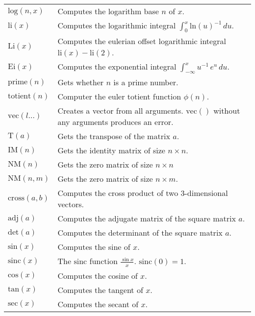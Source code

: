 \documentclass[10pt]{article}
\newcommand{\tabgap}{\vspace{3mm}\\}
\begin{document}
\begin{longtable}{p{}p{}}
        $ \mathrm{log}(n, x) $                     & Computes the logarithm base $ n $ of $ x $. \tabgap
        $ \mathrm{li}(x) $                         & Computes the logarithmic integral $ \int_0^x \mathrm{ln}(u)^{-1}\,du $. \\
        $ \mathrm{Li}(x) $                         & Computes the eulerian offset logarithmic integral $ \mathrm{li}(x) - \mathrm{li}(2) $. \\
        $ \mathrm{Ei}(x) $                         & Computes the exponential integral $ \int_{-\infty}^x u^{-1}\,e^u\,du $. \tabgap
        $ \mathrm{prime}(n) $                      & Gets whether $ n $ is a prime number. \\
        $ \mathrm{totient}(n) $                    & Computer the euler totient function $ \phi(n) $. \tabgap
        $ \mathrm{vec}(l\dots) $                   & Creates a vector from all arguments. $ \mathrm{vec}() $ without any arguments produces an error. \\
        $ \mathrm{T}(a) $                          & Gets the transpose of the matrix $ a $. \\
        $ \mathrm{IM}(n) $                         & Gets the identity matrix of size $ n\times n $. \\
        $ \mathrm{NM}(n) $                         & Gets the zero matrix of size $ n\times n $ \\
        $ \mathrm{NM}(n,m) $                       & Gets the zero matrix of size $ n\times m $. \\
        $ \mathrm{cross}(a, b) $                   & Computes the cross product of two $ 3 $-dimensional vectors. \\
        $ \mathrm{adj}(a) $                        & Computes the adjugate matrix of the square matrix $ a $. \\
        $ \mathrm{det}(a) $                        & Computes the determinant of the square matrix $ a $. \tabgap
        $ \mathrm{sin}(x) $                        & Computes the sine of $ x $. \\
        $ \mathrm{sinc}(x) $                       & The $ \mathrm{sinc} $ function $ \frac{\sin x}{x} $. $ \mathrm{sinc}(0) = 1 $. \\
        $ \mathrm{cos}(x) $                        & Computes the cosine of $ x $. \\
        $ \mathrm{tan}(x) $                        & Computes the tangent of $ x $. \\
        $ \mathrm{sec}(x) $                        & Computes the secant of $ x $. \\

\end{longtable}
\end{document}
